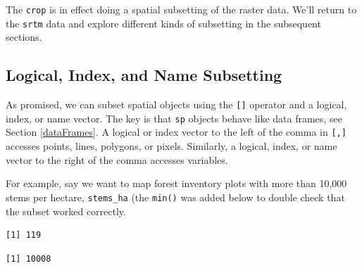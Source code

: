 \documentclass[
]{krantz}
\makeatletter
\newenvironment{Shaded}{\begin{snugshade}}{\end{snugshade}}
\newcommand{\DecValTok}[1]{\textcolor[rgb]{0.06,0.06,0.06}{#1}}
\newcommand{\ErrorTok}[1]{\textcolor[rgb]{0.14,0.14,0.14}{\textbf{#1}}}
\newcommand{\FloatTok}[1]{\textcolor[rgb]{0.06,0.06,0.06}{#1}}
\newcommand{\KeywordTok}[1]{\textcolor[rgb]{0.27,0.27,0.27}{\textbf{#1}}}
\newcommand{\NormalTok}[1]{#1}
\newcommand{\OperatorTok}[1]{\textcolor[rgb]{0.43,0.43,0.43}{\textbf{#1}}}
\newcommand{\StringTok}[1]{\textcolor[rgb]{0.5,0.5,0.5}{#1}}
\newenvironment{kframe}{%
\medskip{}
\setlength{\fboxsep}{.8em}
 \def\at@end@of@kframe{}%
 \ifinner\ifhmode%
  \def\at@end@of@kframe{\end{minipage}}%
  \begin{minipage}{\columnwidth}%
 \fi\fi%
 \def\FrameCommand##1{\hskip\@totalleftmargin \hskip-\fboxsep
 \colorbox{shadecolor}{##1}\hskip-\fboxsep
     \hskip-\linewidth \hskip-\@totalleftmargin \hskip\columnwidth}%
 \MakeFramed {\advance\hsize-\width
   \@totalleftmargin\z@ \linewidth\hsize
   \@setminipage}}%
 {\par\unskip\endMakeFramed%
 \at@end@of@kframe}
\renewenvironment{Shaded}{\begin{kframe}}{\end{kframe}}
\makeatother
\begin{document}
The \texttt{crop} is in effect doing a spatial subsetting of the raster data. We'll return to the \texttt{srtm} data and explore different kinds of subsetting in the subsequent sections.

\hypertarget{logical-index-and-name-subsetting}{%
\subsection{Logical, Index, and Name Subsetting}\label{logical-index-and-name-subsetting}}

As promised, we can subset spatial objects using the \texttt{{[}{]}} operator and a logical, index, or name vector. The key is that \texttt{sp} objects behave like data frames, see Section \ref{dataFrames}. A logical or index vector to the left of the comma in \texttt{{[},{]}} accesses points, lines, polygons, or pixels. Similarly, a logical, index, or name vector to the right of the comma accesses variables.

For example, say we want to map forest inventory plots with more than 10,000 stems per hectare, \texttt{stems\_ha} (the \texttt{min()} was added below to double check that the subset worked correctly.

\begin{Shaded}
\end{Shaded}

\begin{verbatim}
[1] 119
\end{verbatim}

\begin{Shaded}
\end{Shaded}

\begin{verbatim}
[1] 10008
\end{verbatim}
\end{document}
